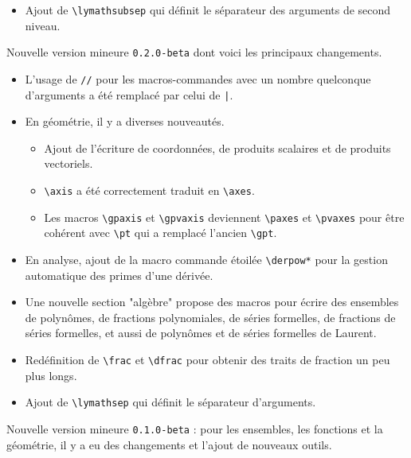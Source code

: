 \documentclass[12pt,a4paper]{article}
\theoremstyle{definition}
\begin{document}
\begin{description}[leftmargin=1em]
\begin{itemize}
		\item Ajout de \verb+\lymathsubsep+ qui définit le séparateur des arguments de second niveau.
	\end{itemize}


	\item[2019-02-21] Nouvelle version mineure \verb+0.2.0-beta+ dont voici les principaux changements.
	\begin{itemize}
		\item L'usage de \verb+//+ pour les macros-commandes avec un nombre quelconque d'arguments a été remplacé par celui de \verb+|+.

		\item En géométrie, il y a diverses nouveautés.
		\begin{itemize}
			\item Ajout de l'écriture de coordonnées, de produits scalaires et de produits vectoriels.

			\item \verb+\axis+ a été correctement traduit en \verb+\axes+.

			\item Les macros \verb+\gpaxis+ et \verb+\gpvaxis+ deviennent \verb+\paxes+ et \verb+\pvaxes+ pour être cohérent avec \verb+\pt+ qui a remplacé l'ancien \verb+\gpt+.
		\end{itemize}

		\item En analyse, ajout de la macro commande étoilée \verb+\derpow*+ pour la gestion automatique des primes d'une dérivée.

		\item Une nouvelle section "algèbre" propose des macros pour écrire des ensembles de polynômes, de fractions polynomiales, de séries formelles, de fractions de séries formelles, et aussi de polynômes et de séries formelles de Laurent.

		\item Redéfinition de \verb+\frac+ et \verb+\dfrac+ pour obtenir des traits de fraction un peu plus longs.

		\item Ajout de \verb+\lymathsep+ qui définit le séparateur d'arguments.
	\end{itemize}


	\item[2017-11-01] Nouvelle version mineure \verb+0.1.0-beta+ : pour les ensembles, les fonctions et la géométrie, il y a eu des changements et l'ajout de nouveaux outils.


\end{description}
\end{document}

